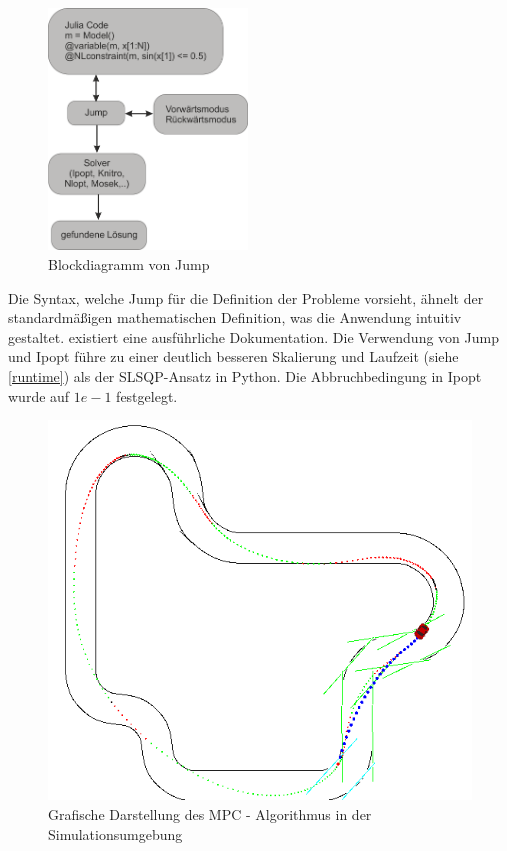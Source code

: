\documentclass{like}
\begin{document}
\begin{figure}[ht!]
	\centering
	\includegraphics[width=150pt]{Abbildungen/jumpDiagram.png}
	\caption{Blockdiagramm von Jump}
	\label{fig:jumpDiagram}
\end{figure}

Die Syntax, welche Jump für die Definition der Probleme vorsieht, ähnelt der standardmäßigen mathematischen Definition, was die Anwendung intuitiv gestaltet. existiert eine ausführliche Dokumentation. Die Verwendung von Jump und Ipopt führe zu einer deutlich besseren Skalierung und Laufzeit (siehe \ref{runtime}) als der \ac{SLSQP}-Ansatz in Python. Die Abbruchbedingung in Ipopt wurde auf $1e-1$ festgelegt.



\begin{figure}[ht!]
	\centering
	\includegraphics[width=350pt]{Abbildungen/sim_visual.png}
	\caption{Grafische Darstellung des MPC - Algorithmus in der Simulationsumgebung}
	\label{fig:jumpDiagram}
\end{figure}
\end{document}
